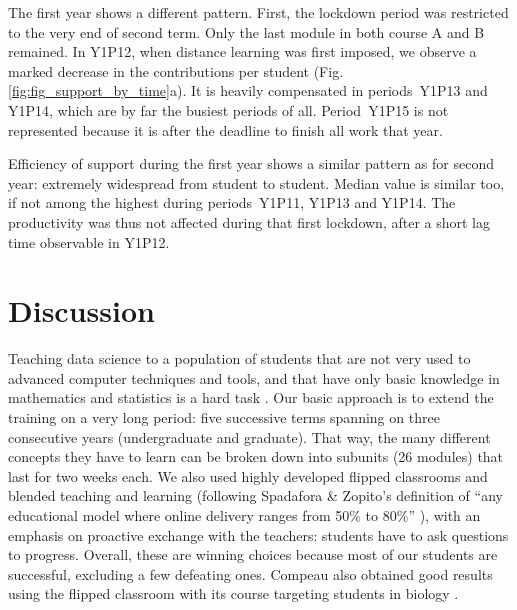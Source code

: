 \documentclass{aims}
\theoremstyle{definition}
\begin{document}
The first year shows a different pattern. First, the lockdown period was
restricted to the very end of second term. Only the last module in both
course A and B remained. In Y1P12, when distance learning was first
imposed, we observe a marked decrease in the contributions per student
(Fig. \ref {fig:fig_support_by_time}a). It is heavily compensated in
periods~Y1P13 and Y1P14, which are by far the busiest periods of all.
Period~Y1P15 is not represented because it is after the deadline to
finish all work that year.

Efficiency of support during the first year shows a similar pattern as
for second year: extremely widespread from student to student. Median
value is similar too, if not among the highest during periods~Y1P11,
Y1P13 and Y1P14. The productivity was thus not affected during that
first lockdown, after a short lag time observable in Y1P12.

\hypertarget{discussion}{%
\section{Discussion}\label{discussion}}

Teaching data science to a population of students that are not very used
to advanced computer techniques and tools, and that have only basic
knowledge in mathematics and statistics is a hard task \cite{Sousa2018}.
Our basic approach is to extend the training on a very long period: five
successive terms spanning on three consecutive years (undergraduate and
graduate). That way, the many different concepts they have to learn can
be broken down into subunits (26 modules) that last for two weeks each.
We also used highly developed flipped classrooms and blended teaching
and learning (following Spadafora \& Zopito's definition of ``any
educational model where online delivery ranges from 50\% to 80\%''
\cite{Spadafora2018}), with an emphasis on proactive exchange with the
teachers: students have to ask questions to progress. Overall, these are
winning choices because most of our students are successful, excluding a
few defeating ones. Compeau also obtained good results using the flipped
classroom with its course targeting students in biology
\cite{Compeau2019}.
\end{document}
